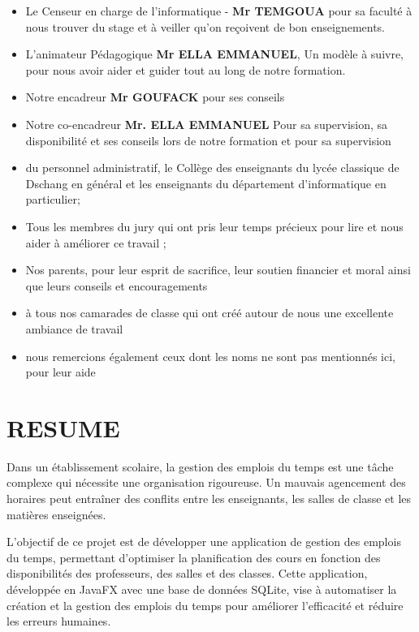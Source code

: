 \documentclass[english,12pt,a4paper]{report}
\begin{document}
\begin{spacing}{1.5}
\begin{itemize}[label=\textbullet, font=\LARGE %
	]
	\item Le Censeur en charge de l'informatique - \textbf{Mr TEMGOUA} pour sa faculté à nous trouver du stage et à veiller qu'on reçoivent de bon enseignements.
	
	\item L'animateur Pédagogique \textbf{Mr ELLA EMMANUEL}, Un modèle à suivre, pour nous avoir aider et guider tout au long de notre formation.
	
	\item Notre encadreur  \textbf{	Mr GOUFACK }  pour ses conseils   
	
	\item Notre co-encadreur \textbf{Mr. ELLA EMMANUEL } Pour sa supervision, sa disponibilité et ses conseils lors de notre formation  et pour sa supervision 
	
	
	\item du personnel administratif, le Collège des enseignants du lycée classique de Dschang en général et les enseignants du département d'informatique en particulier;
	
	\item Tous les membres du jury qui ont pris leur temps précieux pour lire et nous aider à améliorer ce travail ; 
	
	\item 	 Nos parents, pour leur esprit de sacrifice, leur soutien financier et moral ainsi que leurs conseils et encouragements
	\item 	 à tous nos camarades de classe qui ont créé autour de nous une excellente ambiance de travail
	\item 	 nous remercions également ceux dont les noms ne sont pas mentionnés ici, pour leur aide
\end{itemize}	

\chapter*{RESUME}
\hspace{1.2cm}
Dans un établissement scolaire, la gestion des emplois du temps est une tâche complexe qui nécessite une organisation rigoureuse. Un mauvais agencement des horaires peut entraîner des conflits entre les enseignants, les salles de classe et les matières enseignées.

L’objectif de ce projet est de développer une application de gestion des emplois du temps, permettant d’optimiser la planification des cours en fonction des disponibilités des professeurs, des salles et des classes. Cette application, développée en JavaFX avec une base de données SQLite, vise à automatiser la création et la gestion des emplois du temps pour améliorer l’efficacité et réduire les erreurs humaines.


\end{spacing}
\end{document}
